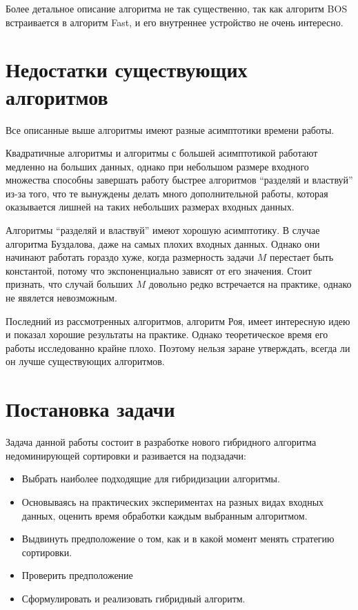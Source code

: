 Более детальное описание алгоритма не так существенно, так как алгоритм BOS встраивается в алгоритм Fast, и его
внутреннее устройство не очень интересно.

\section{Недостатки существующих алгоритмов}

Все описанные выше алгоритмы имеют разные асимптотики времени работы. 

Квадратичные алгоритмы и алгоритмы с большей асимптотикой работают медленно на больших данных, однако при небольшом
размере входного множества способны завершать работу быстрее алгоритмов ``разделяй и властвуй'' из-за того, что те
вынуждены делать много дополнительной работы, которая оказывается лишней на таких небольших размерах входных данных.

Алгоритмы ``разделяй и властвуй'' имеют хорошую асимптотику. В случае алгоритма Буздалова, даже на самых плохих входных 
данных. Однако они начинают работать гораздо хуже, когда размерность задачи $M$ перестает быть константой, потому что 
экспоненциально зависят от его значения. Стоит признать, что случай больших $M$ довольно редко встречается на практике,
однако не явялется невозможным.

Последний из рассмотренных алгоритмов, алгоритм Роя, имеет интересную идею и показал хорошие результаты 
на практике. Однако теоретическое время его работы исследованно крайне плохо. Поэтому нельзя заране утверждать, всегда 
ли он лучше существующих алгоритмов.


\section{Постановка задачи}

Задача данной работы состоит в разработке нового гибридного алгоритма недоминирующей сортировки и разивается на подзадачи: 
\begin{itemize}
	\item Выбрать наиболее подходящие для гибридизации алгоритмы.
	\item Основываясь на практических экспериментах на разных видах входных данных, оценить время обработки каждым
	выбранным алгоритмом.
	\item Выдвинуть предположение о том, как и в какой момент менять стратегию сортировки. 
	\item Проверить предположение
	\item Сформулировать и реализовать гибридный алгоритм.
\end{itemize}
